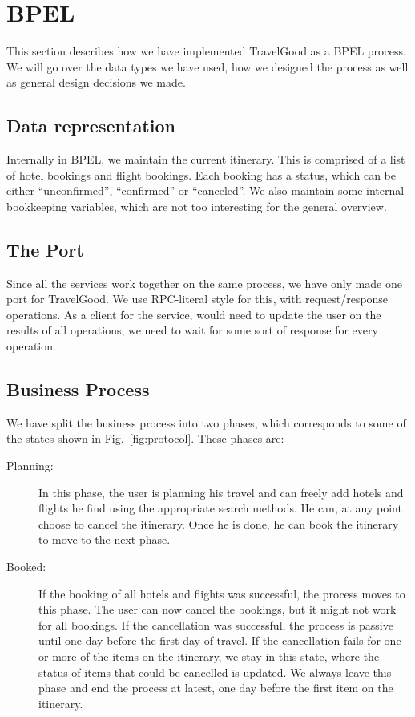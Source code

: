 \section{BPEL}
This section describes how we have implemented TravelGood as a BPEL process. We will go over the data types we have used, how we designed the process as well as general design decisions we made.

\subsection{Data representation}
Internally in BPEL, we maintain the current itinerary. This is comprised of a list of hotel bookings and flight bookings. Each booking has a status, which can be either ``unconfirmed'', ``confirmed'' or ``canceled''. We also maintain some internal bookkeeping variables, which are not too interesting for the general overview.

\subsection{The Port}
Since all the services work together on the same process, we have only made one port for TravelGood. We use RPC-literal style for this, with request/response operations. As a client for the service, would need to update the user on the results of all operations, we need to wait for some sort of response for every operation.

\subsection{Business Process}
We have split the business process into two phases, which corresponds to some of the states shown in Fig.~\ref{fig:protocol}. These phases are:

\begin{description}
\item [Planning:] In this phase, the user is planning his travel and can freely add hotels and flights he find using the appropriate search methods. He can, at any point choose to cancel the itinerary. Once he is done, he can book the itinerary to move to the next phase.

\item[Booked:] If the booking of all hotels and flights was successful, the process moves to this phase. The user can now cancel the bookings, but it might not work for all bookings. If the cancellation was successful, the process is passive until one day before the first day of travel. If the cancellation fails for one or more of the items on the itinerary, we stay in this state, where the status of items that could be cancelled is updated. We always leave this phase and end the process at latest, one day before the first item on the itinerary.

\end{description}

